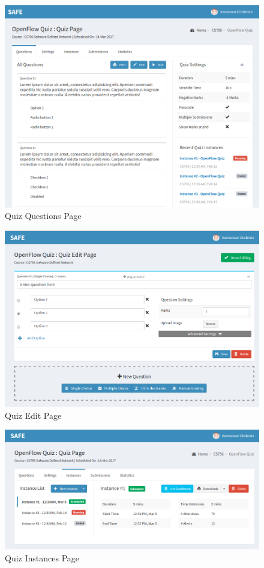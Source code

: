 \begin{figure}[h!]
\begin{center}
\includegraphics[scale=.35]{diagrams/new-ui-3} 
\caption{Quiz Questions Page}
\end{center}
\end{figure}

\begin{figure}[h!]
\begin{center}
\includegraphics[scale=.4]{diagrams/new-ui-4} 
\caption{Quiz Edit Page}
\end{center}
\end{figure}

\begin{figure}[h!]
\begin{center}
\includegraphics[scale=.4]{diagrams/new-ui-5} 
\caption{Quiz Instances Page}
\end{center}
\end{figure}

